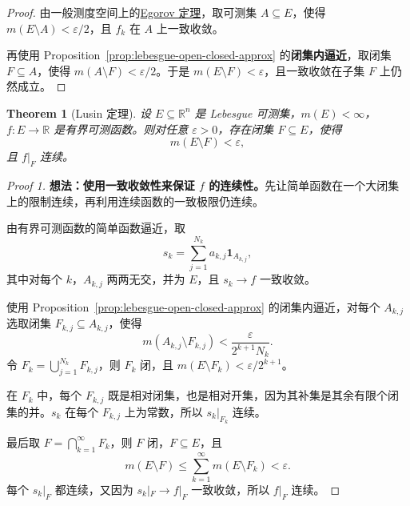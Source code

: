 \documentclass[12pt,letterpaper,twoside,openright]{ctexbook}
\theoremstyle{bluehead}
\newtheorem{theorem}{Theorem}
\theoremstyle{olivehead}
\theoremstyle{orangehead}
\theoremstyle{redremark}
\begin{document}
\begin{proof}
由一般测度空间上的\hyperref[thm:egorov-general]{Egorov 定理}，取可测集 $A\subseteq E$，使得 $m(E\setminus A)<\varepsilon/2$，且 $f_k$ 在 $A$ 上一致收敛。

再使用 Proposition~\ref{prop:lebesgue-open-closed-approx} 的\textbf{闭集内逼近}，取闭集 $F\subseteq A$，使得 $m(A\setminus F)<\varepsilon/2$。于是 $m(E\setminus F)<\varepsilon$，且一致收敛在子集 $F$ 上仍然成立。
\end{proof}
\begin{theorem}[Lusin 定理]
设 $E\subseteq\mathbb R^n$ 是 Lebesgue 可测集，$m(E)<\infty$，$f:E\to\mathbb R$ 是有界可测函数。则对任意 $\varepsilon>0$，存在闭集 $F\subseteq E$，使得
\[
m(E\setminus F)<\varepsilon,
\]
且 $f|_F$ 连续。
\end{theorem}
\begin{proof}[Proof 1]\label{proof:lusin-one}
\textbf{想法：使用一致收敛性来保证 $f$ 的连续性。}先让简单函数在一个大闭集上的限制连续，再利用连续函数的一致极限仍连续。

由有界可测函数的简单函数逼近，取
\[
s_k=\sum_{j=1}^{N_k}a_{k,j}\mathbf1_{A_{k,j}},
\]
其中对每个 $k$，$A_{k,j}$ 两两无交，并为 $E$，且 $s_k\to f$ 一致收敛。

使用 Proposition~\ref{prop:lebesgue-open-closed-approx} 的闭集内逼近，对每个 $A_{k,j}$ 选取闭集 $F_{k,j}\subseteq A_{k,j}$，使得
\[
m(A_{k,j}\setminus F_{k,j})<\frac{\varepsilon}{2^{k+1}N_k}.
\]
令 $F_k=\bigcup_{j=1}^{N_k}F_{k,j}$，则 $F_k$ 闭，且 $m(E\setminus F_k)<\varepsilon/2^{k+1}$。

在 $F_k$ 中，每个 $F_{k,j}$ 既是相对闭集，也是相对开集，因为其补集是其余有限个闭集的并。$s_k$ 在每个 $F_{k,j}$ 上为常数，所以 $s_k|_{F_k}$ 连续。

最后取 $F=\bigcap_{k=1}^{\infty}F_k$，则 $F$ 闭，$F\subseteq E$，且
\[
m(E\setminus F)\leq\sum_{k=1}^{\infty}m(E\setminus F_k)<\varepsilon.
\]
每个 $s_k|_F$ 都连续，又因为 $s_k|_F\to f|_F$ 一致收敛，所以 $f|_F$ 连续。
\end{proof}
\end{document}
